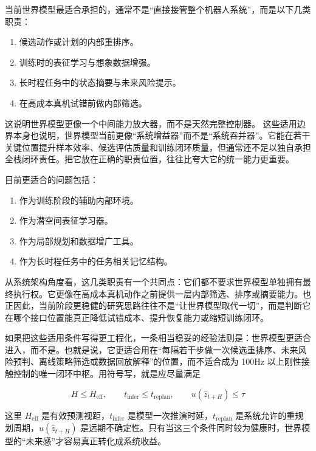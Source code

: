 当前世界模型最适合承担的，通常不是“直接接管整个机器人系统”，而是以下几类职责：

\begin{enumerate}
\item 候选动作或计划的内部重排序。
\item 训练时的表征学习与想象数据增强。
\item 长时程任务中的状态摘要与未来风险提示。
\item 在高成本真机试错前做内部筛选。
\end{enumerate}

这说明世界模型更像一个中间能力放大器，而不是天然完整控制器。 这些适用边界本身也说明，世界模型当前更像“系统增益器”而不是“系统吞并器”。它能在若干关键位置提升样本效率、候选评估质量和训练闭环质量，但通常还不足以独自承担全栈闭环责任。把它放在正确的职责位置，往往比夸大它的统一能力更重要。

目前更适合的问题包括：

\begin{enumerate}
\item 作为训练阶段的辅助内部环境。
\item 作为潜空间表征学习器。
\item 作为局部规划和数据增广工具。
\item 作为长时程任务中的任务相关记忆结构。
\end{enumerate}

从系统架构角度看，这几类职责有一个共同点：它们都不要求世界模型单独拥有最终执行权。它更像在高成本真机动作之前提供一层内部筛选、排序或摘要能力。也正因此，当前阶段更稳健的研究思路往往不是“让世界模型取代一切”，而是判断它在哪个接口位置能真正降低试错成本、提升恢复能力或缩短训练闭环。

如果把这些适用条件写得更工程化，一条相当稳妥的经验法则是：世界模型更适合进入\texttt{}，而不是\texttt{}。也就是说，它更适合用在“每隔若干步做一次候选重排序、未来风险预判、离线策略筛选或数据回放解释”的位置，而不适合成为 100Hz 以上刚性接触控制的唯一闭环中枢。用符号写，就是应尽量满足

\begingroup
\scriptsize
\begin{equation*}
H \le H_{\mathrm{eff}}, \qquad
t_{\mathrm{infer}} \le t_{\mathrm{replan}}, \qquad
u(\hat{z}_{t+H}) \le \tau
\end{equation*}
\endgroup

这里 \(H_{\mathrm{eff}}\) 是有效预测视距，\(t_{\mathrm{infer}}\) 是模型一次推演时延，\(t_{\mathrm{replan}}\) 是系统允许的重规划周期，\(u(\hat{z}_{t+H})\) 是远期不确定性。只有当这三个条件同时较为健康时，世界模型的“未来感”才容易真正转化成系统收益。

